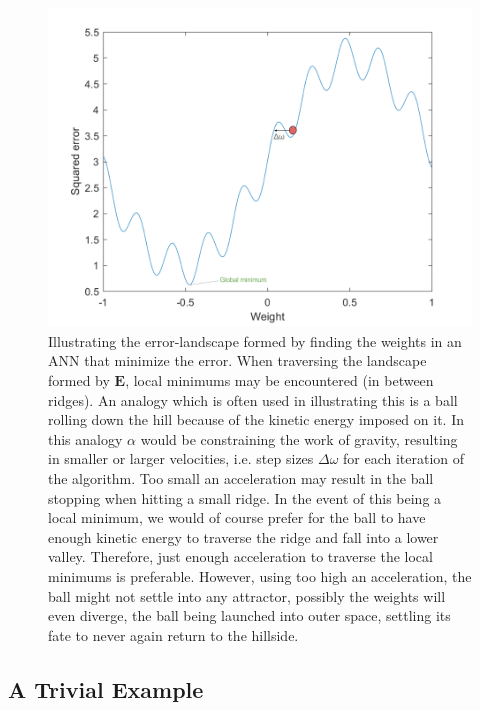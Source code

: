 \begin{figure}
\centering
\includegraphics[width=12cm, height=8.5cm]{fig/error_landscape_with_ball.png}
\caption{Illustrating the error-landscape formed by finding the weights in an ANN that minimize the error. When traversing the landscape formed by $\textbf{E}$, local minimums may be encountered (in between ridges). An analogy which is often used in illustrating this is a ball rolling down the hill because of the kinetic energy imposed on it. In this analogy $\alpha$ would be constraining the work of gravity, resulting in smaller or larger velocities, i.e. step sizes $\Delta \omega$ for each iteration of the algorithm.
Too small an acceleration may result in the ball stopping when hitting a small ridge. In the event of this being a local minimum, we would of course prefer for the ball to have enough kinetic energy to traverse the ridge and fall into a lower valley. Therefore, just enough acceleration to traverse the local minimums is preferable. However, using too high an acceleration, the ball might not settle into any attractor, possibly the weights will even diverge, the ball being launched into outer space, settling its fate to never again return to the hillside.}
\label{fig:steepest_descent}
\end{figure}

\subsection{A Trivial Example}

